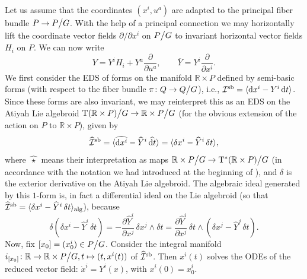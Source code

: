 \documentclass[11pt]{article}
\theoremstyle{plain}
\theoremstyle{definition}
\begin{document}
Let us assume that the coordinates $(x^i,u^a)$ are adapted to the principal fiber bundle $P\to P\big\slash G$. With the help of a principal connection we may horizontally lift the coordinate vector fields $\partial/\partial x^i$ on $P\big\slash G$ to invariant horizontal vector fields $H_i$ on $P$. We can now write
\begin{equation*}
    Y=Y^i H_i + Y^a \frac{\partial }{\partial u^a}, \qquad \overline Y = Y^i \frac{\partial }{\partial x^i}.
\end{equation*}
We first consider the EDS of forms on the manifold $\mathbb{R}\times P$ defined by semi-basic forms (with respect to the fiber bundle $\pi\colon Q\to Q \big\slash G$), i.e., ${\mathcal I}^{\rm{sb}} = \langle {\mathrm d}x^i-Y^i \, {\mathrm d}t\rangle$. Since these forms are also invariant, we may reinterpret this as an EDS on the Atiyah Lie algebroid $\mathrm{T}({\mathbb R \times P})\big\slash G \to \mathbb R \times P\big\slash G$ (for the obvious extension of the action on $P$ to $\mathbb R \times P$), given by
\begin{equation*}
    {\widehat{\mathcal I}}^{\rm{sb}} = \langle \widehat{{\mathrm d}x^i}-\widehat{Y}^i \, \widehat{{\mathrm d}t}\rangle = \langle \delta x^i-{\widehat Y}^i \, \delta t\rangle,
\end{equation*}
where $\widehat{\,\star\,}$ means their interpretation as maps $\mathbb{R}\times P\big\slash G\to \mathrm{T}^{\ast}(\mathbb{R}\times P)\big\slash G$  (in accordance with the notation we had introduced at the beginning of ), and $\delta$ is the exterior derivative on the Atiyah Lie algebroid. The algebraic ideal generated by this $1$-form is, in fact a differential ideal on the Lie algebroid (so that ${\widehat{\mathcal I}}^{\rm{sb}}= \langle \delta x^i-{\widehat Y}^i \, \delta t\rangle_{\mathrm{alg}}$), because
\begin{equation*}
    \delta \left(\delta x^i-{\widehat Y}^i \, \delta t\right)  = - \frac{\partial {\widehat Y}^i}{\partial x^j} \, \delta x^j \wedge\delta t =  \frac{\partial {\widehat Y}^i}{\partial x^j} \, \delta t \wedge \left(\delta x^j-{\widehat Y}^j \, \delta t\right).   
\end{equation*}
Now, fix $[x_0]=(x^i_0) \in P\big\slash G$. Consider the integral manifold $i_{[x_0] }\colon \mathbb R \to \mathbb R \times P\big\slash G, t\mapsto (t,x^i(t))$ of ${\widehat{\mathcal I}}^{\rm{sb}}$. Then $x^i(t)$ solves the ODEs of the reduced vector field: ${\dot x}^i=Y^i(x)$, with $x^i(0)=x^i_0$.
\end{document}
